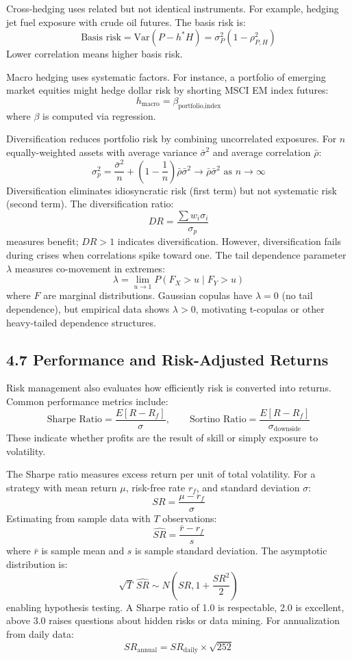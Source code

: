 \documentclass[11pt,a4paper]{article}
\begin{document}
Cross-hedging uses related but not identical instruments. For example, hedging jet fuel exposure with crude oil futures. The basis risk is:
\[
\text{Basis risk} = \text{Var}(P - h^*H) = \sigma_P^2(1 - \rho_{P,H}^2)
\]
Lower correlation means higher basis risk.

Macro hedging uses systematic factors. For instance, a portfolio of emerging market equities might hedge dollar risk by shorting MSCI EM index futures:
\[
h_{\text{macro}} = \beta_{\text{portfolio,index}}
\]
where $\beta$ is computed via regression.

Diversification reduces portfolio risk by combining uncorrelated exposures. For $n$ equally-weighted assets with average variance $\bar{\sigma}^2$ and average correlation $\bar{\rho}$:
\[
\sigma_p^2 = \frac{\bar{\sigma}^2}{n} + \left(1 - \frac{1}{n}\right)\bar{\rho}\bar{\sigma}^2 \to \bar{\rho}\bar{\sigma}^2 \text{ as } n \to \infty
\]
Diversification eliminates idiosyncratic risk (first term) but not systematic risk (second term). The diversification ratio:
\[
DR = \frac{\sum w_i \sigma_i}{\sigma_p}
\]
measures benefit; $DR > 1$ indicates diversification. However, diversification fails during crises when correlations spike toward one. The tail dependence parameter $\lambda$ measures co-movement in extremes:
\[
\lambda = \lim_{u \to 1} P(F_X > u \mid F_Y > u)
\]
where $F$ are marginal distributions. Gaussian copulas have $\lambda = 0$ (no tail dependence), but empirical data shows $\lambda > 0$, motivating t-copulas or other heavy-tailed dependence structures.

\subsection*{4.7 Performance and Risk-Adjusted Returns}

Risk management also evaluates how efficiently risk is converted into returns. Common performance metrics include:
\[
\text{Sharpe Ratio} = \frac{E[R - R_f]}{\sigma}, \qquad 
\text{Sortino Ratio} = \frac{E[R - R_f]}{\sigma_{\text{downside}}}
\]
These indicate whether profits are the result of skill or simply exposure to volatility.

The Sharpe ratio measures excess return per unit of total volatility. For a strategy with mean return $\mu$, risk-free rate $r_f$, and standard deviation $\sigma$:
\[
SR = \frac{\mu - r_f}{\sigma}
\]
Estimating from sample data with $T$ observations:
\[
\widehat{SR} = \frac{\bar{r} - r_f}{s}
\]
where $\bar{r}$ is sample mean and $s$ is sample standard deviation. The asymptotic distribution is:
\[
\sqrt{T}\,\widehat{SR} \sim N\left(SR, 1 + \frac{SR^2}{2}\right)
\]
enabling hypothesis testing. A Sharpe ratio of 1.0 is respectable, 2.0 is excellent, above 3.0 raises questions about hidden risks or data mining. For annualization from daily data:
\[
SR_{\text{annual}} = SR_{\text{daily}} \times \sqrt{252}
\]
\end{document}
